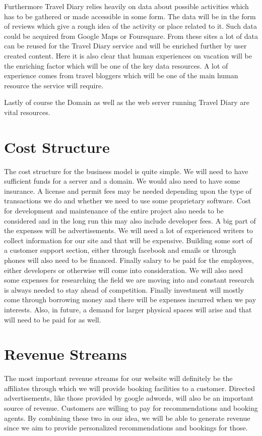 \documentclass[IN,english]{tumbook}
\begin{document}
Furthermore Travel Diary relies heavily on data about possible activities which has to be gathered or made accessible in some form. The data will be in the form of reviews which give a rough idea of the activity or place related to it. Such data could be acquired from Google Maps or Foursquare. From these sites a lot of data can be reused for the Travel Diary service and will be enriched further by user created content. Here it is also clear that human experiences on vacation will be the enriching factor which will be one of the key data resources. A lot of experience comes from travel bloggers which will be one of the main human resource the service will require. 

Lastly of course the Domain as well as the web server running Travel Diary are vital resources.

\section{Cost Structure}

The cost structure for the business model is quite simple. We will need to have sufficient funds for a server and a domain. We would also need to have some insurance. A license and permit fees may be needed depending upon the type of transactions we do and whether we need to use some proprietary software. Cost for development and maintenance of the entire project also needs to be considered and in the long run this may also include developer fees. A big part of the expenses will be advertisements. We will need a lot of experienced writers to collect information for our site and that will be expensive. Building some sort of a customer support section, either through facebook and emails or through phones will also need to be financed. Finally salary to be paid for the employees, either developers or otherwise will come into consideration. We will also need some expenses for researching the field we are moving into and constant research is always needed to stay ahead of competition. Finally investment will mostly come through borrowing money and there will be expenses incurred when we pay interests. Also, in future, a demand for larger physical spaces will arise and that will need to be paid for as well.

\section{Revenue Streams}

The most important revenue streams for our website will definitely be the affiliates through which we will provide booking facilities to a customer. Directed advertisements, like those provided by google adwords, will also be an important source of revenue. Customers are willing to pay for recommendations and booking agents. By combining these two in our idea, we will be able to generate revenue since we aim to provide personalized recommendations and bookings for those.
\end{document}
